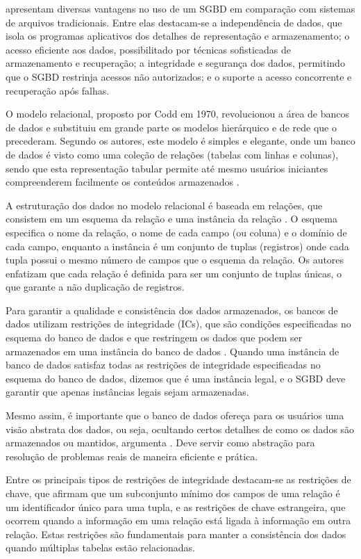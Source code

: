  apresentam diversas vantagens no uso de um SGBD em comparação com sistemas de arquivos tradicionais. Entre elas destacam-se a independência de dados, que isola os programas aplicativos dos detalhes de representação e armazenamento; o acesso eficiente aos dados, possibilitado por técnicas sofisticadas de armazenamento e recuperação; a integridade e segurança dos dados, permitindo que o SGBD restrinja acessos não autorizados; e o suporte a acesso concorrente e recuperação após falhas.

O modelo relacional, proposto por Codd em 1970, revolucionou a área de bancos de dados e substituiu em grande parte os modelos hierárquico e de rede que o precederam. Segundo os autores, este modelo é simples e elegante, onde um banco de dados é visto como uma coleção de relações (tabelas com linhas e colunas), sendo que esta representação tabular permite até mesmo usuários iniciantes compreenderem facilmente os conteúdos armazenados .

A estruturação dos dados no modelo relacional é baseada em relações, que consistem em um esquema da relação e uma instância da relação . O esquema especifica o nome da relação, o nome de cada campo (ou coluna) e o domínio de cada campo, enquanto a instância é um conjunto de tuplas (registros) onde cada tupla possui o mesmo número de campos que o esquema da relação. Os autores enfatizam que cada relação é definida para ser um conjunto de tuplas únicas, o que garante a não duplicação de registros.

Para garantir a qualidade e consistência dos dados armazenados, os bancos de dados utilizam restrições de integridade (ICs), que são condições especificadas no esquema do banco de dados e que restringem os dados que podem ser armazenados em uma instância do banco de dados . Quando uma instância de banco de dados satisfaz todas as restrições de integridade especificadas no esquema do banco de dados, dizemos que é uma instância legal, e o SGBD deve garantir que apenas instâncias legais sejam armazenadas.

Mesmo assim, é importante que o banco de dados ofereça para os usuários uma visão abstrata dos dados, ou seja, ocultando certos detalhes de como os dados são armazenados ou mantidos, argumenta . Deve servir como abstração para resolução de problemas reais de maneira eficiente e prática.

Entre os principais tipos de restrições de integridade destacam-se as restrições de chave, que afirmam que um subconjunto mínimo dos campos de uma relação é um identificador único para uma tupla, e as restrições de chave estrangeira, que ocorrem quando a informação em uma relação está ligada à informação em outra relação. Estas restrições são fundamentais para manter a consistência dos dados quando múltiplas tabelas estão relacionadas.

